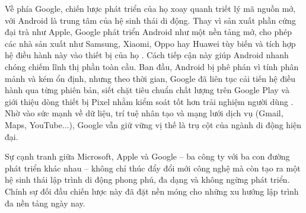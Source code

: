     \begin{flushleft}
      \hspace*{0.8cm}Về phía Google, chiến lược phát triển của họ xoay quanh triết lý mã nguồn mở, với Android là trung tâm của hệ sinh thái di động. Thay vì sản xuất phần cứng đại trà như Apple, Google phát triển Android như một nền tảng mở, cho phép các nhà sản xuất như Samsung, Xiaomi, Oppo hay Huawei tùy biến và tích hợp hệ điều hành này vào thiết bị của họ \cite{android-open-platform}. Cách tiếp cận này giúp Android nhanh chóng chiếm lĩnh thị phần toàn cầu. Ban đầu, Android bị phê phán vì tính phân mảnh và kém ổn định, nhưng theo thời gian, Google đã liên tục cải tiến hệ điều hành qua từng phiên bản, siết chặt tiêu chuẩn chất lượng trên Google Play và giới thiệu dòng thiết bị Pixel nhằm kiểm soát tốt hơn trải nghiệm người dùng \cite{android-evolution}. Nhờ vào sức mạnh về dữ liệu, trí tuệ nhân tạo và mạng lưới dịch vụ (Gmail, Maps, YouTube...), Google vẫn giữ vững vị thế là trụ cột của ngành di động hiện đại.
    \end{flushleft}

    \begin{flushleft}
      \hspace*{0.8cm}Sự cạnh tranh giữa Microsoft, Apple và Google – ba công ty với ba con đường phát triển khác nhau – không chỉ thúc đẩy đổi mới công nghệ mà còn tạo ra một hệ sinh thái lập trình di động phong phú, đa dạng và không ngừng phát triển. Chính sự đối đầu chiến lược này đã đặt nền móng cho những xu hướng lập trình đa nền tảng ngày nay.
    \end{flushleft}

